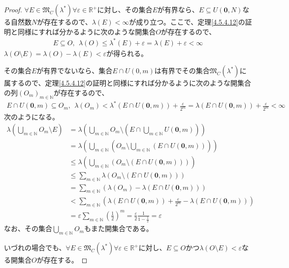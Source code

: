\documentclass[dvipdfmx]{jsarticle}
\begin{document}
\begin{proof}
$\forall E \in \mathfrak{M}_{C}\left( \lambda^{*} \right)\forall\varepsilon \in \mathbb{R}^{+}$に対し、その集合$E$が有界なら、$E \subseteq U\left( \mathbf{0},N \right)$なる自然数$N$が存在するので、$\lambda(E) < \infty$が成り立つ。ここで、定理\ref{4.5.4.12}の証明と同様にすれば分かるように次のような開集合$O$が存在するので、
\begin{align*}
E \subseteq O,\ \ \lambda(O) \leq \lambda^{*}(E) + \varepsilon = \lambda(E) + \varepsilon < \infty
\end{align*}
$\lambda(O \setminus E) = \lambda(O) - \lambda(E) < \varepsilon$が得られる。\par
その集合$E$が有界でないなら、集合$E \cap U(0,m)$は有界でその集合$\mathfrak{M}_{C}\left( \lambda^{*} \right)$に属するので、定理\ref{4.5.4.12}の証明と同様にすれば分かるように次のような開集合の列$\left( O_{m} \right)_{m \in \mathbb{N}}$が存在するので、
\begin{align*}
E \cap U\left( \mathbf{0},m \right) \subseteq O_{m},\ \ \lambda\left( O_{m} \right) < \lambda^{*}\left( E \cap U\left( \mathbf{0},m \right) \right) + \frac{\varepsilon}{2^{m}} = \lambda\left( E \cap U\left( \mathbf{0},m \right) \right) + \frac{\varepsilon}{2^{m}} < \infty
\end{align*}
次のようになる。
\begin{align*}
\lambda\left( \bigcup_{m \in \mathbb{N}} O_{m} \setminus E \right) &= \lambda\left( \bigcup_{m \in \mathbb{N}} O_{m} \setminus \left( E \cap \bigcup_{m \in \mathbb{N}} {U\left( \mathbf{0},m \right)} \right) \right)\\
&= \lambda\left( \bigcup_{m \in \mathbb{N}} \left( O_{m} \setminus \bigcup_{m \in \mathbb{N}} \left( E \cap U\left( \mathbf{0},m \right) \right) \right) \right)\\
&\leq \lambda\left( \bigcup_{m \in \mathbb{N}} \left( O_{m} \setminus \left( E \cap U\left( \mathbf{0},m \right) \right) \right) \right)\\
&\leq \sum_{m \in \mathbb{N}} {\lambda\left( O_{m} \setminus \left( E \cap U\left( \mathbf{0},m \right) \right) \right)}\\
&= \sum_{m \in \mathbb{N}} \left( \lambda\left( O_{m} \right) - \lambda\left( E \cap U\left( \mathbf{0},m \right) \right) \right)\\
&< \sum_{m \in \mathbb{N}} \left( \lambda\left( E \cap U\left( \mathbf{0},m \right) \right) + \frac{\varepsilon}{2^{m}} - \lambda\left( E \cap U\left( \mathbf{0},m \right) \right) \right)\\
&= \varepsilon\sum_{m \in \mathbb{N}} \left( \frac{1}{2} \right)^{m} = \frac{\varepsilon}{2}\frac{1}{1 - \frac{1}{2}} = \varepsilon
\end{align*}
なお、その集合$\bigcup_{m \in \mathbb{N}} O_{m}$もまた開集合である。\par
いづれの場合でも、$\forall E \in \mathfrak{M}_{C}\left( \lambda^{*} \right)\forall\varepsilon \in \mathbb{R}^{+}$に対し、$E \subseteq O$かつ$\lambda(O \setminus E) < \varepsilon$なる開集合$O$が存在する。
\end{proof}
\end{document}
